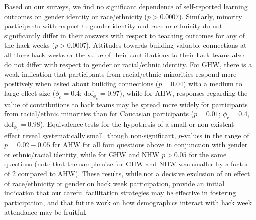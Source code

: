 Based on our surveys, we find no significant dependence of self-reported learning outcomes on gender identity or race/ethnicity ($p > 0.0007$). Similarly, minority participants with respect to gender identity and race or ethnicity do not significantly differ in their answers with respect to teaching outcomes for any of the hack weeks ($p > 0.0007$). Attitudes towards building valuable connections at all three hack weeks or the value of their contributions to their hack teams also do not differ with respect to gender or racial/ethnic identity. For GHW, there is a weak indication that participants from racial/ethnic minorities respond more positively when asked about building connections ($p=0.04$) with a medium to large effect size ($\phi_c = 0.4$; $\mathrm{dof}_{\phi_c} = 0.97$), while for AHW, responses regarding the value of contributions to hack teams may be spread more widely for participants from racial/ethnic minorities than for Caucasian participants ($p = 0.01$; $\phi_c = 0.4$, $\mathrm{dof}_{\phi_c} = 0.98$). Equivalence tests for the hypothesis of a small or non-existent effect reveal systematically small, though non-significant, $p$-values in the range of $p=0.02-0.05$ for AHW for all four questions above in conjunction with gender or ethnic/racial identity, while for GHW and NHW $p > 0.05$ for the same questions (note that the sample size for GHW and NHW was smaller by a factor of 2 compared to AHW). These results, while not a decisive exclusion of an effect of race/ethnicity or gender on hack week participation, provide an initial indication that our careful facilitation strategies may be effective in fostering participation, and that future work on how demographics interact with hack week attendance may be fruitful.

